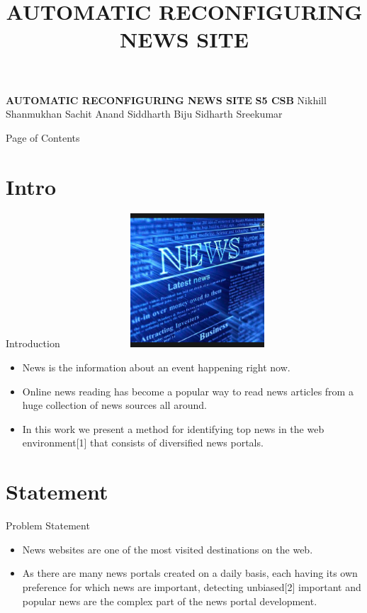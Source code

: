 \documentclass{beamer}
\title{AUTOMATIC RECONFIGURING NEWS SITE}
\begin{document}
\begin{frame}{}
\centering \textbf{ AUTOMATIC RECONFIGURING NEWS SITE} \newline \newline
\centering \textbf{S5 CSB} \newline \newline
\centering\small Nikhill Shanmukhan \newline
\centering Sachit Anand \newline
\centering Siddharth Biju \newline
\centering Sidharth Sreekumar \newline
\end{frame}
	\begin{frame}{Page of Contents}
		\tableofcontents
	\end{frame}
	\section{Intro}
	\begin{frame}{Introduction}
	    \includegraphics[width=10cm, height=5cm]{Shot.png}
		\begin{itemize}
			\item \Large{News is the information about an event happening right
			now.}
		\end{itemize}
	\end{frame}
	\begin{frame}{}
	    \begin{itemize}
			\item\Large Online news reading has become a popular way to read news articles from a huge collection of news sources all around.
			\item In this work we present a method for identifying top news in the web environment[1] that consists of diversiﬁed news portals. 
		\end{itemize}
	\end{frame}
	\section{Statement}
	\begin{frame}{Problem Statement}
	    \begin{itemize}
	        \item  \Large{News websites are one of the most visited destinations on the web.}
	        \item \Large { As there are many news portals created on a daily basis, each having its own preference for which news are important, detecting unbiased[2] important and popular news are the complex part of the news portal development.}
	    \end{itemize}
	\end{frame}
\end{document}

